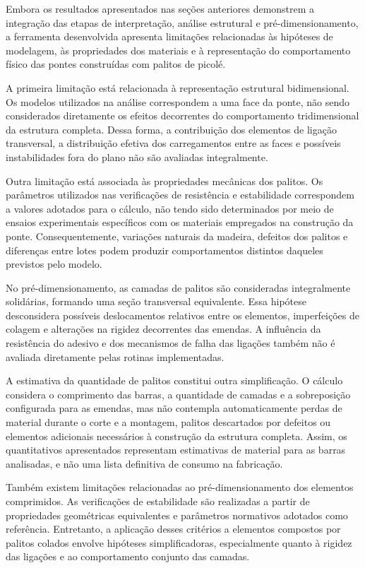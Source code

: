 Embora os resultados apresentados nas seções anteriores demonstrem a integração das etapas de interpretação, análise estrutural e pré-dimensionamento, a ferramenta desenvolvida apresenta limitações relacionadas às hipóteses de modelagem, às propriedades dos materiais e à representação do comportamento físico das pontes construídas com palitos de picolé.

A primeira limitação está relacionada à representação estrutural bidimensional. Os modelos utilizados na análise correspondem a uma face da ponte, não sendo considerados diretamente os efeitos decorrentes do comportamento tridimensional da estrutura completa. Dessa forma, a contribuição dos elementos de ligação transversal, a distribuição efetiva dos carregamentos entre as faces e possíveis instabilidades fora do plano não são avaliadas integralmente.

Outra limitação está associada às propriedades mecânicas dos palitos. Os parâmetros utilizados nas verificações de resistência e estabilidade correspondem a valores adotados para o cálculo, não tendo sido determinados por meio de ensaios experimentais específicos com os materiais empregados na construção da ponte. Consequentemente, variações naturais da madeira, defeitos dos palitos e diferenças entre lotes podem produzir comportamentos distintos daqueles previstos pelo modelo.

No pré-dimensionamento, as camadas de palitos são consideradas integralmente solidárias, formando uma seção transversal equivalente. Essa hipótese desconsidera possíveis deslocamentos relativos entre os elementos, imperfeições de colagem e alterações na rigidez decorrentes das emendas. A influência da resistência do adesivo e dos mecanismos de falha das ligações também não é avaliada diretamente pelas rotinas implementadas.

A estimativa da quantidade de palitos constitui outra simplificação. O cálculo considera o comprimento das barras, a quantidade de camadas e a sobreposição configurada para as emendas, mas não contempla automaticamente perdas de material durante o corte e a montagem, palitos descartados por defeitos ou elementos adicionais necessários à construção da estrutura completa. Assim, os quantitativos apresentados representam estimativas de material para as barras analisadas, e não uma lista definitiva de consumo na fabricação.

Também existem limitações relacionadas ao pré-dimensionamento dos elementos comprimidos. As verificações de estabilidade são realizadas a partir de propriedades geométricas equivalentes e parâmetros normativos adotados como referência. Entretanto, a aplicação desses critérios a elementos compostos por palitos colados envolve hipóteses simplificadoras, especialmente quanto à rigidez das ligações e ao comportamento conjunto das camadas.

